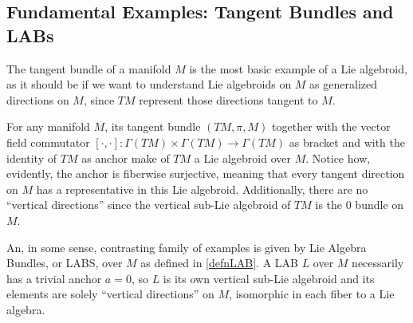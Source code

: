 \subsection{Fundamental Examples: Tangent Bundles and LABs}

The tangent bundle of a manifold $M$ is the most basic example of a Lie algebroid, as it should be if we want to understand Lie algebroids on $M$ as generalized directions on $M$, since $TM$ represent those directions tangent to $M$.

For any manifold $M$, its tangent bundle $(TM, \pi, M)$ together with the vector field commutator $[\cdot , \cdot]: \Gamma(TM) \times \Gamma(TM) \to \Gamma(TM)$ as bracket and with the identity of $TM$ as anchor make of $TM$ a Lie algebroid over $M$. Notice how, evidently, the anchor is fiberwise surjective, meaning that every tangent direction on $M$ has a representative in this Lie algebroid. Additionally, there are no ``vertical directions'' since the vertical sub-Lie algebroid of $TM$ is the $0$ bundle on $M$.

An, in some sense, contrasting family of examples is given by Lie Algebra Bundles, or LABS, over $M$ as defined in \ref{defnLAB}. A LAB $L$ over $M$ necessarily has a trivial anchor $a = 0$, so $L$ is its own vertical sub-Lie algebroid and its elements are solely ``vertical directions'' on $M$, isomorphic in each fiber to a Lie algebra.







